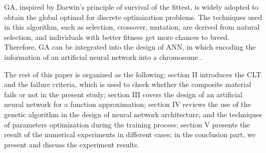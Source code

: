 GA, inspired by Darwin’s principle of survival of the fittest, is widely adopted
to obtain the global optimal for discrete optimization problems. The techniques
used in this algorithm, such as selection, crossover, mutation, are derived from
natural selection, and individuals with better fitness get more chances to
breed. Therefore, GA can be integrated into the design of ANN, in which encoding
the information of an artificial neural network into a chromosome
\cite{liu1996evolutionary,rodzin2016neuroevolution}.

The rest of this paper is organized as the following: section II introduces the
CLT and the failure criteria, which is used to check whether the composite
material fails or not in the present study; section III covers the design of an
artificial neural network for a function approximation; section IV reviews the
use of the genetic algorithm in the design of neural network architecture, and
the techniques of parameters optimization during the training process; section V
presents the result of the numerical experiments in different cases; in the
conclusion part, we present and discuss the experiment results.




